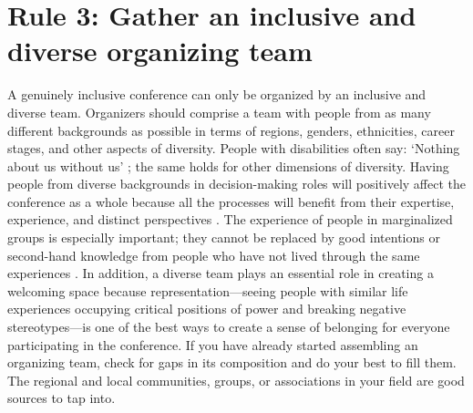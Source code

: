 \documentclass[10pt,letterpaper]{article}
\begin{document}
\section*{Rule 3: Gather an inclusive and diverse organizing team}
\label{rule_organizing_team}

A genuinely inclusive conference can only be organized by an inclusive and diverse team.
Organizers should comprise a team with people from as many different backgrounds as possible in terms of regions, genders, ethnicities, career stages, and other aspects of diversity.
People with disabilities often say: `Nothing about us without us' \cite{charlton_nothing_1998, werner_nothing_1998}; the same holds for other dimensions of diversity. 
Having people from diverse backgrounds in decision-making roles will positively affect the conference as a whole because all the processes will benefit from their expertise, experience, and distinct perspectives \cite{hongGroupsDiverseProblem2004}. 
The experience of people in marginalized groups
is especially important; they cannot be replaced by good intentions or second-hand knowledge from people who have not lived through the same experiences \cite{costanzachockDesign2020}.
In addition, a diverse team plays an essential role in creating a welcoming space because representation—seeing people with similar life experiences occupying critical positions of power and breaking negative stereotypes—is one of the best ways to create a sense of belonging for everyone participating in the conference.
If you have already started assembling an organizing team, check for gaps in its composition and do your best to fill them. 
The regional and local communities, groups, or associations in your field are good sources to tap into.
\end{document}
